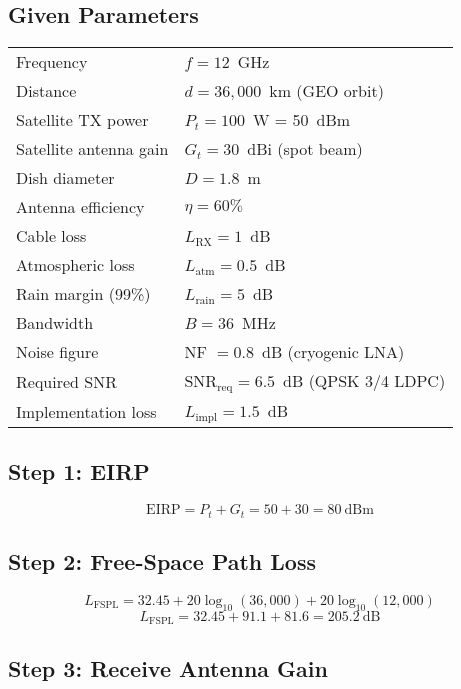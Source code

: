 \subsection*{Given Parameters}

\begin{tabular}{@{}ll@{}}
Frequency & $f = 12$~GHz \\
Distance & $d = 36{,}000$~km (GEO orbit) \\
Satellite TX power & $P_t = 100$~W = 50~dBm \\
Satellite antenna gain & $G_t = 30$~dBi (spot beam) \\
Dish diameter & $D = 1.8$~m \\
Antenna efficiency & $\eta = 60\%$ \\
Cable loss & $L_{\text{RX}} = 1$~dB \\
Atmospheric loss & $L_{\text{atm}} = 0.5$~dB \\
Rain margin (99\%) & $L_{\text{rain}} = 5$~dB \\
Bandwidth & $B = 36$~MHz \\
Noise figure & NF $= 0.8$~dB (cryogenic LNA) \\
Required SNR & $\text{SNR}_{\text{req}} = 6.5$~dB (QPSK 3/4 LDPC) \\
Implementation loss & $L_{\text{impl}} = 1.5$~dB \\
\end{tabular}

\subsection*{Step 1: EIRP}

\begin{equation}
\text{EIRP} = P_t + G_t = 50 + 30 = 80~\text{dBm}
\end{equation}

\subsection*{Step 2: Free-Space Path Loss}

\begin{equation}
L_{\text{FSPL}} = 32.45 + 20\log_{10}(36{,}000) + 20\log_{10}(12{,}000)
\end{equation}
\begin{equation}
L_{\text{FSPL}} = 32.45 + 91.1 + 81.6 = 205.2~\text{dB}
\end{equation}

\subsection*{Step 3: Receive Antenna Gain}

